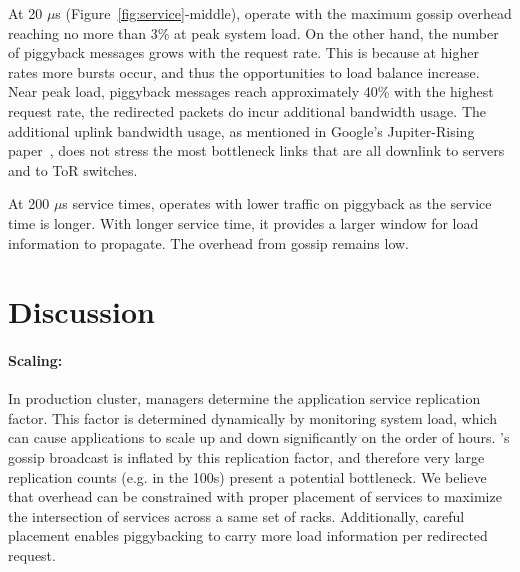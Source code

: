 At 20 $\mu$s (Figure~\ref{fig:service}-middle), \daronpon
operate with the maximum gossip overhead reaching no more than 3\% at peak system load. 
%
On the other hand, the number of piggyback messages grows with the request rate. 
%
This is because at higher rates more bursts occur, and thus the opportunities to load balance increase.
%
Near peak load, piggyback messages reach approximately 40\% with the highest request rate, 
the redirected packets do incur additional bandwidth usage.
%
The additional uplink bandwidth usage, as mentioned in Google's Jupiter-Rising paper~\cite{jupiter-rising}, does not stress the most bottleneck links that are all downlink to servers and to ToR switches. 

At 200 $\mu$s service times, \daronpon operates with lower traffic on piggyback as the service time is longer.
%   
With longer service time, it provides a larger window for load information to propagate. 
%
The overhead from gossip remains low. 
%
%

%

\section{Discussion}
\label{darapon:sec:discuss}

\paragraph{Scaling:} In production cluster, managers determine the application
service replication factor. This factor is determined dynamically by monitoring
system load, which can cause applications to scale up and down significantly on
the order of hours.  \daronpon{}'s gossip broadcast is inflated by this
replication factor, and therefore very large replication counts (e.g. in the
100s) present a potential bottleneck.  We believe that overhead can be
constrained with proper placement of services to maximize the intersection of
services across a same set of racks.  Additionally, careful placement enables
piggybacking to carry more load information per redirected request.

